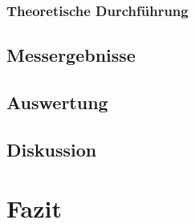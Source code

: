 \documentclass[12pt]{scrartcl}
\begin{document}
\subsubsection{Theoretische Durchführung}
\subsection{Messergebnisse}
\subsection{Auswertung}
\subsection{Diskussion}

\section{Fazit}

\end{document}
